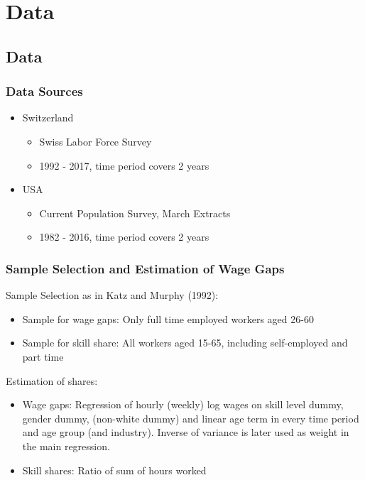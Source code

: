 \documentclass[11pt]{beamer} \usetheme{Frankfurt}
\begin{document}
\section{Data}
\subsection{Data}
\begin{frame}
  \frametitle{Data Sources}
  \begin{itemize}
  \item Switzerland
    \begin{itemize}
    \item Swiss Labor Force Survey
    \item 1992 - 2017, time period covers 2 years
    \end{itemize}
  \item USA
    \begin{itemize}
    \item Current Population Survey, March Extracts
    \item 1982 - 2016, time period covers 2 years
    \end{itemize}
  \end{itemize}
\end{frame}

\begin{frame}
  \frametitle{Sample Selection and Estimation of Wage Gaps}
  Sample Selection as in Katz and Murphy (1992):
  \begin{itemize}
  \item Sample for wage gaps: Only full time employed workers aged
    26-60
  \item Sample for skill share: All workers aged 15-65, including
    self-employed and part time
  \end{itemize}
  Estimation of shares:
  \begin{itemize}
  \item Wage gaps: Regression of hourly (weekly) log wages on skill level
    dummy, gender dummy, (non-white dummy) and linear age term in
    every time period and age group (and industry). Inverse of
    variance is later used as weight in the main regression.
  \item Skill shares: Ratio of sum of hours worked
  \end{itemize}
\end{frame}
\end{document}
